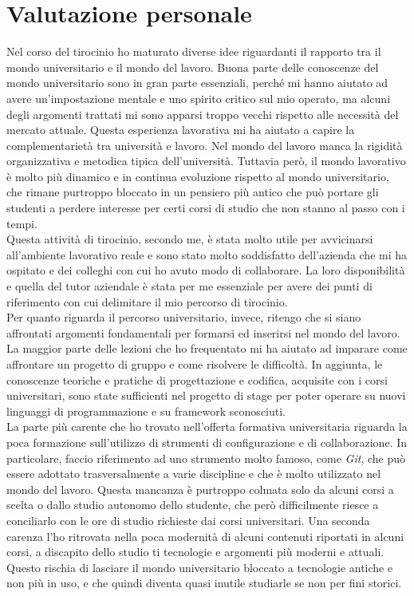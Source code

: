 \section{Valutazione personale}

Nel corso del tirocinio ho maturato diverse idee riguardanti il rapporto tra il mondo universitario e il mondo del lavoro. Buona parte delle conoscenze del mondo universitario sono in gran parte essenziali, perché mi hanno aiutato ad avere un'impostazione mentale e uno spirito critico sul mio operato, ma alcuni degli argomenti trattati mi sono apparsi troppo vecchi rispetto alle necessità del mercato attuale. Questa esperienza lavorativa mi ha aiutato a capire la complementarietà tra università e lavoro. Nel mondo del lavoro manca la rigidità organizzativa e metodica tipica dell'università. Tuttavia però, il mondo lavorativo è molto più dinamico e in continua evoluzione rispetto al mondo universitario, che rimane purtroppo bloccato in un pensiero più antico che può portare gli studenti a perdere interesse per certi corsi di studio che non stanno al passo con i tempi.\\
Questa attività di tirocinio, secondo me, è stata molto utile per avvicinarsi all'ambiente lavorativo reale e sono stato molto soddisfatto dell'azienda che mi ha ospitato e dei colleghi con cui ho avuto modo di collaborare. La loro disponibilità e quella del tutor aziendale è stata per me essenziale per avere dei punti di riferimento con cui delimitare il mio percorso di tirocinio.\\
Per quanto riguarda il percorso universitario, invece, ritengo che si siano affrontati argomenti fondamentali per formarsi ed inserirsi nel mondo del lavoro. La maggior parte delle lezioni che ho frequentato mi ha aiutato ad imparare come affrontare un progetto di gruppo e come risolvere le difficoltà. In aggiunta, le conoscenze teoriche e pratiche di progettazione e codifica, acquisite con i corsi universitari, sono state sufficienti nel progetto di stage per poter operare su nuovi linguaggi di programmazione e su framework sconosciuti.\\
La parte più carente che ho trovato nell'offerta formativa universitaria riguarda la poca formazione sull'utilizzo di strumenti di configurazione e di collaborazione. In particolare, faccio riferimento ad uno strumento molto famoso, come \textit{Git}, che può essere adottato trasversalmente a varie discipline e che è molto utilizzato nel mondo del lavoro. Questa mancanza è purtroppo colmata solo da alcuni corsi a scelta o dallo studio autonomo dello studente, che però difficilmente riesce a conciliarlo con le ore di studio richieste dai corsi universitari. Una seconda carenza l'ho ritrovata nella poca modernità di alcuni contenuti riportati in alcuni corsi, a discapito dello studio ti tecnologie e argomenti più moderni e attuali. Questo rischia di lasciare il mondo universitario bloccato a tecnologie antiche e non più in uso, e che quindi diventa quasi inutile studiarle se non per fini storici.\\
